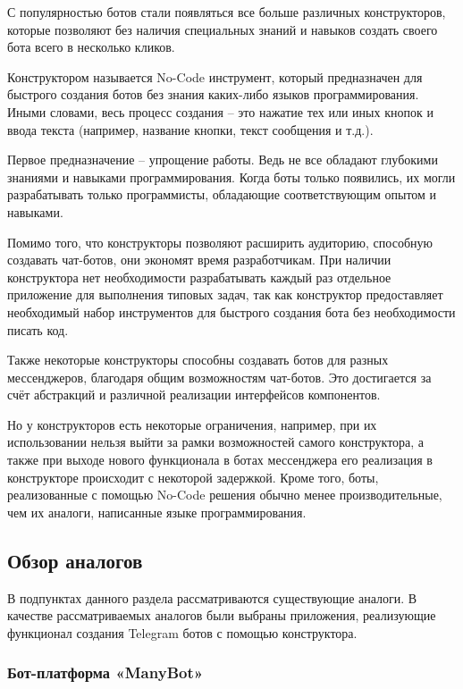С популярностью ботов стали появляться все больше различных
конструкторов, которые позволяют
без наличия специальных знаний и
навыков создать своего бота всего в несколько кликов.

Конструктором называется No-Code инструмент, который
предназначен для
быстрого создания ботов без знания каких-либо языков программирования.
Иными словами, весь процесс создания – это нажатие тех или иных кнопок и
ввода текста (например, название кнопки, текст сообщения и т.д.).

Первое предназначение – упрощение работы. Ведь не все обладают
глубокими знаниями и навыками программирования. Когда боты только
появились, их могли разрабатывать только программисты, обладающие
соответствующим опытом и навыками.

Помимо того, что конструкторы позволяют расширить аудиторию,
способную создавать чат-ботов, они экономят время разработчикам. При
наличии конструктора нет необходимости разрабатывать каждый раз
отдельное приложение для выполнения типовых
задач, так как конструктор предоставляет необходимый
набор инструментов для быстрого создания бота
без необходимости писать код.

Также некоторые конструкторы способны создавать ботов для разных мессенджеров,
благодаря общим возможностям чат-ботов. Это достигается за счёт
абстракций и различной реализации интерфейсов компонентов.

Но у конструкторов есть некоторые ограничения, например, при их
использовании нельзя выйти за рамки возможностей самого конструктора, а
также при выходе нового функционала в ботах мессенджера его реализация в
конструкторе происходит с некоторой задержкой. Кроме того, боты,
реализованные с помощью No-Code решения обычно менее производительные,
чем их аналоги, написанные языке программирования.


\subsection{Обзор аналогов}

В подпунктах данного раздела рассматриваются существующие аналоги.
В качестве рассматриваемых аналогов были выбраны приложения,
реализующие функционал создания Telegram ботов с помощью конструктора.


\subsubsection{Бот-платформа «ManyBot»}


